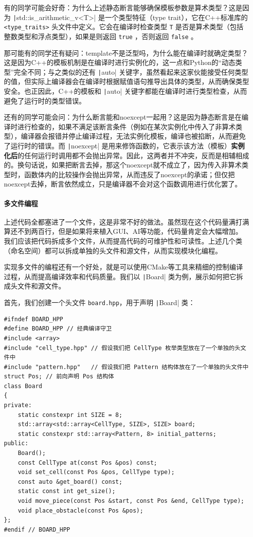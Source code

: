 \begin{tip}
    有的同学可能会好奇：为什么上述静态断言能够确保模板参数是算术类型？这是因为 \texttt|std::is_arithmetic_v<T>| 是一个类型特征（type trait），它在C++标准库的 \texttt{<type\_traits>} 头文件中定义。它会在编译时检查类型 \texttt{T} 是否是算术类型（包括整数类型和浮点类型），如果是则返回 \texttt{true} ，否则返回 \texttt{false} 。

    那可能有的同学还有疑问：template不是泛型吗，为什么能在编译时就确定类型？这是因为C++的模板机制是在编译时进行实例化的，这一点和Python的“动态类型”完全不同；与之类似的还有 \texttt|auto| 关键字，虽然看起来这家伙能接受任何类型的值，但实际上编译器会在编译时根据赋值语句推导出具体的类型，从而确保类型安全。也正因此，C++的模板和 \texttt|auto| 关键字都能在编译时进行类型检查，从而避免了运行时的类型错误。

    还有的同学可能会问：为什么断言能和noexcept一起用？这是因为静态断言是在编译时进行检查的，如果不满足该断言条件（例如在某次实例化中传入了非算术类型），编译器会报错并停止编译过程，无法实例化模板，编译也被掐断，从而避免了运行时的错误。而 \texttt|noexcept| 是用来修饰函数的，它表示该方法（模板）\textbf{实例化后}的任何运行时调用都不会抛出异常。因此，这两者并不冲突，反而是相辅相成的。换句话说，如果把断言去掉，那这个noexcept就不成立了，因为传入非算术类型时，函数体内的比较操作会抛出异常，从而违反了noexcept的承诺；但仅把noexcept去掉，断言依然成立，只是编译器不会对这个函数调用进行优化罢了。
\end{tip}

\paragraph{多文件编程}
上述代码全都塞进了一个文件，这是非常不好的做法。虽然现在这个代码量满打满算还不到两百行，但是如果将来植入GUI、AI等功能，代码量肯定会大幅增加。我们应该把代码拆成多个文件，从而提高代码的可维护性和可读性。上述几个类（命名空间）都可以拆成单独的头文件和源文件，从而实现模块化编程。

实现多文件的编程还有一个好处，就是可以使用CMake等工具来精细的控制编译过程，从而提高编译效率和代码质量。我们以 \texttt|Board| 类为例，展示如何把它拆成头文件和源文件。

首先，我们创建一个头文件 \verb|board.hpp|，用于声明 \texttt|Board| 类：

\begin{verbatim}
#ifndef BOARD_HPP
#define BOARD_HPP // 经典编译守卫
#include <array>
#include "cell_type.hpp" // 假设我们把 CellType 枚举类型放在了一个单独的头文件中
#include "pattern.hpp"   // 假设我们把 Pattern 结构体放在了一个单独的头文件中
struct Pos; // 前向声明 Pos 结构体
class Board
{
private:
    static constexpr int SIZE = 8;
    std::array<std::array<CellType, SIZE>, SIZE> board;
    static constexpr std::array<Pattern, 8> initial_patterns;
public:
    Board();
    const CellType at(const Pos &pos) const;
    void set_cell(const Pos &pos, CellType type);
    const auto &get_board() const;
    static const int get_size();
    void move_piece(const Pos &start, const Pos &end, CellType type);
    void place_obstacle(const Pos &pos);
};
#endif // BOARD_HPP
\end{verbatim}

